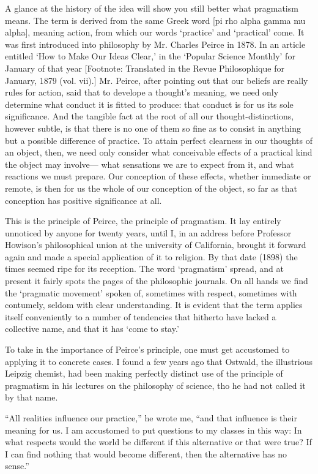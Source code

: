 \documentclass[]{article}
\begin{document}
A glance at the history of the idea will show you still better what
pragmatism means. The term is derived from the same Greek word [pi rho
alpha gamma mu alpha], meaning action, from which our words `practice'
and `practical' come. It was first introduced into philosophy by Mr.
Charles Peirce in 1878. In an article entitled `How to Make Our Ideas
Clear,' in the `Popular Science Monthly' for January of that year
[Footnote: Translated in the Revue Philosophique for January, 1879 (vol.
vii).] Mr. Peirce, after pointing out that our beliefs are really rules
for action, said that to develope a thought's meaning, we need only
determine what conduct it is fitted to produce: that conduct is for
us its sole significance. And the tangible fact at the root of all our
thought-distinctions, however subtle, is that there is no one of them so
fine as to consist in anything but a possible difference of practice.
To attain perfect clearness in our thoughts of an object, then, we need
only consider what conceivable effects of a practical kind the object
may involve--- what sensations we are to expect from it, and what
reactions we must prepare. Our conception of these effects, whether
immediate or remote, is then for us the whole of our conception of the
object, so far as that conception has positive significance at all.

This is the principle of Peirce, the principle of pragmatism. It lay
entirely unnoticed by anyone for twenty years, until I, in an address
before Professor Howison's philosophical union at the university of
California, brought it forward again and made a special application
of it to religion. By that date (1898) the times seemed ripe for its
reception. The word `pragmatism' spread, and at present it fairly
spots the pages of the philosophic journals. On all hands we find the
`pragmatic movement' spoken of, sometimes with respect, sometimes with
contumely, seldom with clear understanding. It is evident that the term
applies itself conveniently to a number of tendencies that hitherto have
lacked a collective name, and that it has `come to stay.'

To take in the importance of Peirce's principle, one must get accustomed
to applying it to concrete cases. I found a few years ago that Ostwald,
the illustrious Leipzig chemist, had been making perfectly distinct
use of the principle of pragmatism in his lectures on the philosophy of
science, tho he had not called it by that name.

``All realities influence our practice,'' he wrote me, ``and that influence
is their meaning for us. I am accustomed to put questions to my classes
in this way: In what respects would the world be different if this
alternative or that were true? If I can find nothing that would become
different, then the alternative has no sense.''
\end{document}

